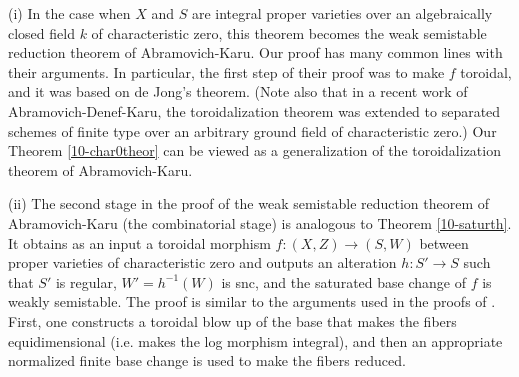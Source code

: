 \documentclass[10pt]{../fichiers-configuration-latex/smfart}
\begin{document}
\begin{remark2}
(i) In the case when $X$ and $S$ are integral proper varieties over an algebraically
closed field $k$ of characteristic zero, this theorem becomes the weak semistable
reduction theorem of Abramovich-Karu. Our proof has many common lines with their
arguments. In particular, the first step of their proof was to make $f$ toroidal,
and it was based on de Jong's theorem. (Note also that in a recent work \cite{ADK@Toroidal}
of Abramovich-Denef-Karu, the toroidalization theorem was extended to separated schemes
of finite type over an arbitrary ground field of characteristic zero.)
Our Theorem \ref{10-char0theor} can be viewed as a generalization
of the toroidalization theorem of Abramovich-Karu.

(ii) The second stage in the proof of the weak semistable reduction theorem of Abramovich-Karu
(the combinatorial stage) is analogous to Theorem \ref{10-saturth}. It obtains as an input
a toroidal morphism $f{\colon}(X,Z)\to(S,W)$ between proper varieties of characteristic zero
and outputs an alteration $h{\colon}S'\to S$ such that $S'$ is regular, $W'=h^{-1}(W)$ is snc,
and the saturated base change of $f$ is weakly semistable. The proof is similar to the arguments
used in the proofs of \cite[A.4.4 and A.4.3]{IKN@Quasi-unipotent}. First, one constructs a toroidal
blow up of the base that makes the fibers equidimensional (i.e. makes the log morphism integral),
and then an appropriate normalized finite base change is used to make the fibers reduced.
\end{remark2}

\ifx\danslelivre\undefined


\end{document}
